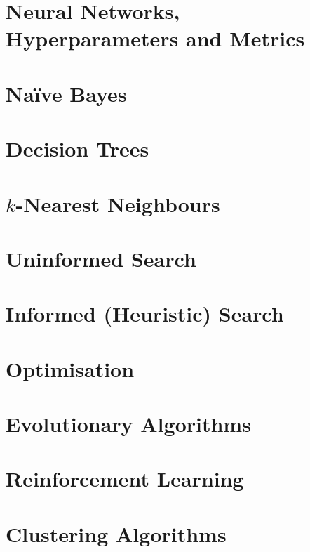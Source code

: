 \documentclass[
  11pt,
  a4paper,
]{article}
\begin{document}
\section{Neural Networks, Hyperparameters and Metrics}


\section{Na\"{i}ve Bayes}


\section{Decision Trees}


\section{\texorpdfstring{\( k \)}{k}-Nearest Neighbours}


\section{Uninformed Search}


\section{Informed (Heuristic) Search}


\section{Optimisation}


\section{Evolutionary Algorithms}


\section{Reinforcement Learning}


\section{Clustering Algorithms}

\end{document}
